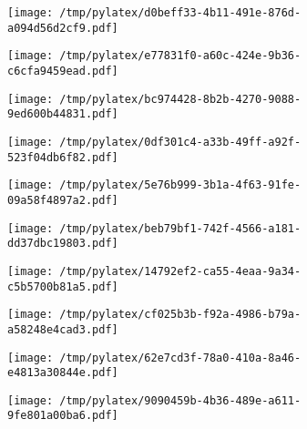 \documentclass{article}
\begin{document}
\begin{figure}[htbp]
\begin{subfigure}[b]{.3\linewidth}
\texttt{[image: /tmp/pylatex/d0beff33-4b11-491e-876d-a094d56d2cf9.pdf]}
\end{subfigure}
\begin{subfigure}[b]{.3\linewidth}
\texttt{[image: /tmp/pylatex/e77831f0-a60c-424e-9b36-c6cfa9459ead.pdf]}
\end{subfigure}
\begin{subfigure}[b]{.3\linewidth}
\texttt{[image: /tmp/pylatex/bc974428-8b2b-4270-9088-9ed600b44831.pdf]}
\end{subfigure}
\begin{subfigure}[b]{.3\linewidth}
\texttt{[image: /tmp/pylatex/0df301c4-a33b-49ff-a92f-523f04db6f82.pdf]}
\end{subfigure}
\begin{subfigure}[b]{.3\linewidth}
\texttt{[image: /tmp/pylatex/5e76b999-3b1a-4f63-91fe-09a58f4897a2.pdf]}
\end{subfigure}
\begin{subfigure}[b]{.3\linewidth}
\texttt{[image: /tmp/pylatex/beb79bf1-742f-4566-a181-dd37dbc19803.pdf]}
\end{subfigure}
\begin{subfigure}[b]{.3\linewidth}
\texttt{[image: /tmp/pylatex/14792ef2-ca55-4eaa-9a34-c5b5700b81a5.pdf]}
\end{subfigure}
\begin{subfigure}[b]{.3\linewidth}
\texttt{[image: /tmp/pylatex/cf025b3b-f92a-4986-b79a-a58248e4cad3.pdf]}
\end{subfigure}
\begin{subfigure}[b]{.3\linewidth}
\texttt{[image: /tmp/pylatex/62e7cd3f-78a0-410a-8a46-e4813a30844e.pdf]}
\end{subfigure}
\begin{subfigure}[b]{.3\linewidth}
\texttt{[image: /tmp/pylatex/9090459b-4b36-489e-a611-9fe801a00ba6.pdf]}
\end{subfigure}
\end{figure}
\end{document}
